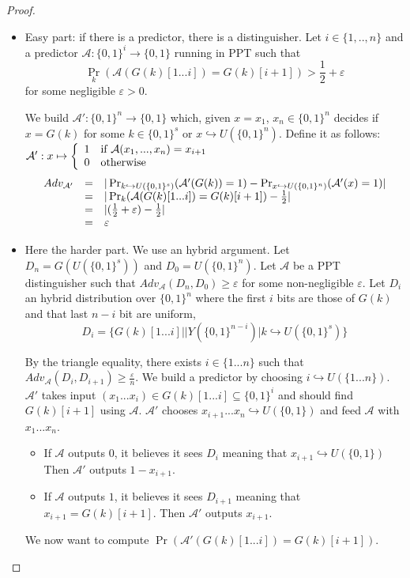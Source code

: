 \documentclass{article}
\newcommand{\A}{\mathcal{A}}
\renewcommand{\epsilon}{\varepsilon}
\begin{document}
\begin{proof}
\begin{itemize}
\item Easy part: if there is a predictor, there is a distinguisher. Let $i\in\{1,..,n\}$ and a predictor $\A:\{0,1\}^i\rightarrow\{0,1\}$ running in PPT such that 
\[\Pr_k(\A(G(k)[1...i])=G(k)[i+1])>\frac{1}{2}+\epsilon\]
for some negligible $\epsilon>0$.

We build $\A':\{0,1\}^n\rightarrow\{0,1\}$ which, given $x=x_1$, $x_n\in\{0,1\}^n$ decides if $x=G(k)$ for some $k\in\{0,1\}^s$ or $x\hookrightarrow U(\{0,1\}^n)$. Define it as follows: $\A':x\mapsto\left\{\begin{array}{r l}
1 & \text{if $\A(x_1,...,x_n)=x_{i+1}$}\\
0 & \text{otherwise}
\end{array}\right.$
\[\begin{array}{r c l}
Adv_{\A'} &=& |\Pr_{k\hookrightarrow U(\{0,1\}^s)}(\A'(G(k))=1)-\Pr_{x\hookrightarrow U(\{0,1\}^n)}(\A'(x)=1)|\\
&=& |\Pr_k(\A(G(k)[1...i])=G(k)[i+1]) - \frac{1}{2}|\\
&=& |(\frac{1}{2}+\epsilon)-\frac{1}{2}|\\
&=& \epsilon
\end{array}\]
\item Here the harder part. We use an hybrid argument. Let $D_n=G(U(\{0,1\}^s))$ and $D_0=U(\{0,1\}^n)$. Let $\A$ be a PPT distinguisher such that $Adv_\A(D_n,D_0)\geq\epsilon$ for some non-negligible $\epsilon$. Let $D_i$ an hybrid distribution over $\{0,1\}^n$ where the first $i$ bits are those of $G(k)$ and that last $n-i$ bit are uniform, \[D_i=\{G(k)[1...i]||Y(\{0,1\}^{n-i})|k\hookrightarrow U(\{0,1\}^s)\}\]

By the triangle equality, there exists $i\in\{1...n\}$ such that $Adv_\A(D_i,D_{i+1})\geq\frac{\epsilon}{n}$. We build a predictor by choosing $i\hookrightarrow U(\{1...n\})$. $\A'$ takes input $(x_1...x_i)\in G(k)[1...i]\subseteq\{0,1\}^i$ and should find $G(k)[i+1]$ using $\A$.
$\A'$ chooses $x_{i+1}...x_n\hookrightarrow U(\{0,1\})$ and feed $\A$ with $x_1...x_n$.
\begin{itemize}
\item If $\A$ outputs $0$, it believes it sees $D_i$ meaning that $x_{i+1}\hookrightarrow U(\{0,1\})$ Then $\A'$ outputs $1-x_{i+1}$.
\item If $\A$ outputs $1$, it believes it sees $D_{i+1}$ meaning that $x_{i+1}=G(k)[i+1]$. Then $\A'$ outputs $x_{i+1}$.
\end{itemize}
We now want to compute $\Pr(\A'(G(k)[1...i])=G(k)[i+1])$.


\end{itemize}
\end{proof}
\end{document}
